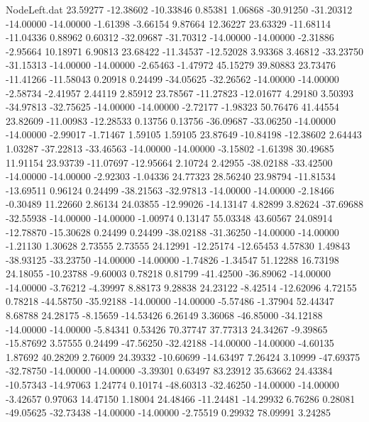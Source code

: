 \begin{filecontents}{NodeLeft.dat}
  23.59277  -12.38602  -10.33846     0.85381    1.06868  -30.91250  -31.20312  -14.00000  -14.00000   -1.61398   -3.66154    9.87664   12.36227
  23.63329  -11.68114  -11.04336     0.88962    0.60312  -32.09687  -31.70312  -14.00000  -14.00000   -2.31886   -2.95664   10.18971    6.90813
  23.68422  -11.34537  -12.52028     3.93368    3.46812  -33.23750  -31.15313  -14.00000  -14.00000   -2.65463   -1.47972   45.15279   39.80883
  23.73476  -11.41266  -11.58043     0.20918    0.24499  -34.05625  -32.26562  -14.00000  -14.00000   -2.58734   -2.41957    2.44119    2.85912
  23.78567  -11.27823  -12.01677     4.29180    3.50393  -34.97813  -32.75625  -14.00000  -14.00000   -2.72177   -1.98323   50.76476   41.44554
  23.82609  -11.00983  -12.28533     0.13756    0.13756  -36.09687  -33.06250  -14.00000  -14.00000   -2.99017   -1.71467    1.59105    1.59105
  23.87649  -10.84198  -12.38602     2.64443    1.03287  -37.22813  -33.46563  -14.00000  -14.00000   -3.15802   -1.61398   30.49685   11.91154
  23.93739  -11.07697  -12.95664     2.10724    2.42955  -38.02188  -33.42500  -14.00000  -14.00000   -2.92303   -1.04336   24.77323   28.56240
  23.98794  -11.81534  -13.69511     0.96124    0.24499  -38.21563  -32.97813  -14.00000  -14.00000   -2.18466   -0.30489   11.22660    2.86134
  24.03855  -12.99026  -14.13147     4.82899    3.82624  -37.69688  -32.55938  -14.00000  -14.00000   -1.00974    0.13147   55.03348   43.60567
  24.08914  -12.78870  -15.30628     0.24499    0.24499  -38.02188  -31.36250  -14.00000  -14.00000   -1.21130    1.30628    2.73555    2.73555
  24.12991  -12.25174  -12.65453     4.57830    1.49843  -38.93125  -33.23750  -14.00000  -14.00000   -1.74826   -1.34547   51.12288   16.73198
  24.18055  -10.23788   -9.60003     0.78218    0.81799  -41.42500  -36.89062  -14.00000  -14.00000   -3.76212   -4.39997    8.88173    9.28838
  24.23122   -8.42514  -12.62096     4.72155    0.78218  -44.58750  -35.92188  -14.00000  -14.00000   -5.57486   -1.37904   52.44347    8.68788
  24.28175   -8.15659  -14.53426     6.26149    3.36068  -46.85000  -34.12188  -14.00000  -14.00000   -5.84341    0.53426   70.37747   37.77313
  24.34267   -9.39865  -15.87692     3.57555    0.24499  -47.56250  -32.42188  -14.00000  -14.00000   -4.60135    1.87692   40.28209    2.76009
  24.39332  -10.60699  -14.63497     7.26424    3.10999  -47.69375  -32.78750  -14.00000  -14.00000   -3.39301    0.63497   83.23912   35.63662
  24.43384  -10.57343  -14.97063     1.24774    0.10174  -48.60313  -32.46250  -14.00000  -14.00000   -3.42657    0.97063   14.47150    1.18004
  24.48466  -11.24481  -14.29932     6.76286    0.28081  -49.05625  -32.73438  -14.00000  -14.00000   -2.75519    0.29932   78.09991    3.24285

\end{filecontents}
